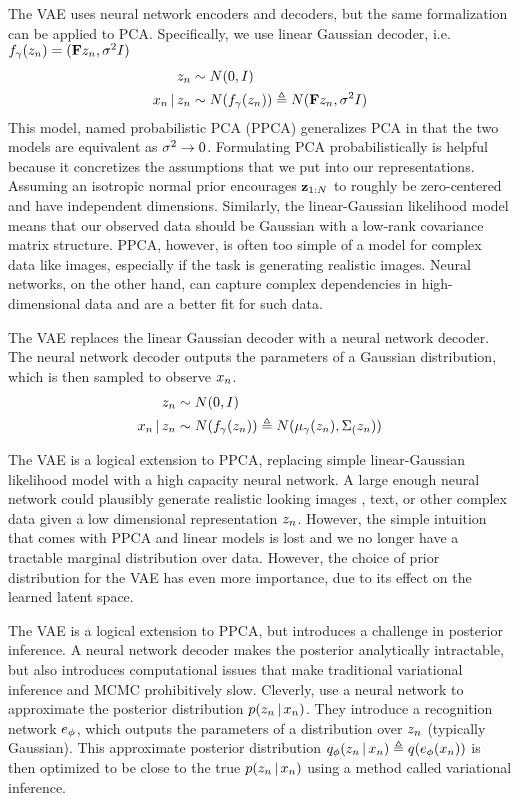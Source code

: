 The VAE uses
neural network encoders and decoders,
but the same formalization
can be applied to PCA.
Specifically, we
use linear Gaussian decoder,
i.e. $f_\gamma(z_n) = (\mathbf{F} z_n, \sigma^2 I)$
\begin{align*}
    z_n &\sim N(0, I) \\
    x_n \,|\, z_n &\sim N(f_\gamma(z_n)) \triangleq N(\mathbf{F} z_n, \sigma^2 I)
\end{align*}
This model, named probabilistic PCA (PPCA)
generalizes PCA in that the two models
are equivalent as $\sigma^2 \rightarrow 0$.
Formulating PCA probabilistically
is helpful because it concretizes
the assumptions that we
put into our representations.
Assuming an isotropic normal
prior encourages $\mathbf{z}_{1:N}$
to roughly be zero-centered and
have independent dimensions.
Similarly, the linear-Gaussian
likelihood model means
that our observed data
should be Gaussian with
a low-rank covariance matrix structure.
PPCA, however, is often too simple
of a model for complex data like images,
especially if the task is generating
realistic images. Neural networks, on
the other hand, can capture complex
dependencies in high-dimensional
data and are a better fit
for such data. 

The VAE replaces the linear Gaussian
decoder with a neural
network decoder.
The neural network decoder outputs
the parameters of a Gaussian distribution,
which is then sampled to observe $x_n$.
\begin{align*}
    z_n &\sim N(0, I) \\
    x_n \,|\, z_n &\sim N(f_\gamma(z_n)) \triangleq N(\mu_\gamma(z_n), \Sigma_(z_n))
\end{align*}

The VAE is a logical extension to PPCA,
replacing simple linear-Gaussian
likelihood model with a high capacity
neural network. A large enough 
neural network could plausibly
generate realistic looking images
, text, or other complex data
given a low dimensional representation $z_n$.
However, the simple intuition that comes
with PPCA and linear models 
is lost and we no longer
have a tractable marginal distribution over data.
However, the choice of prior
distribution for the VAE has even more importance,
due to its effect on the learned latent
space.

The VAE is a logical extension to PPCA, but
introduces a challenge in posterior inference.
A neural network decoder makes the posterior
analytically intractable, but also
introduces computational issues that make traditional
variational inference and MCMC prohibitively slow.
Cleverly, \cite{Kingma2013} use a
neural network to approximate the posterior distribution
$p(z_n \,|\, x_n)$. They introduce
a recognition network $e_\phi$,
which outputs the parameters of a distribution
over $z_n$ (typically Gaussian). This
approximate posterior distribution $q_\phi(z_n \,|\, x_n) \triangleq q(e_\phi(x_n))$ is then optimized to be 
close to the true $p(z_n \,|\, x_n)$
using a method called variational inference.

